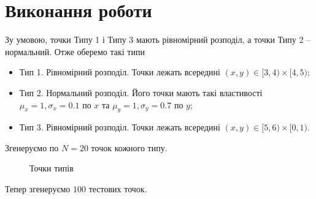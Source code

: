 \documentclass[a4paper,12pt]{article}
\begin{document}
\section{Виконання роботи}

Зу умовою, точки Типу 1 і Типу 3 мають рівномірний розподіл, а точки Типу 2 -- нормальний. Отже оберемо такі типи
\begin{itemize}
	\item Тип 1. Рівномірний розподіл. Точки лежать всередині $(x,y) \in [3,4) \times [4,5)$;
	\item Тип 2. Нормальний розподіл. Його точки мають такі властивості  $\mu_x = 1, \sigma_x = 0.1$ по $x$ та $\mu_y = 1, \sigma_y = 0.7$ по $y$;
	\item Тип 3. Рівномірний розподіл. Точки лежать всередині $(x,y) \in [5,6) \times [0,1)$.
\end{itemize}

Згенеруємо по $N=20$ точок кожного типу.

\begin{figure}[h!]
	\caption{Точки типів}
\end{figure}

Тепер згенеруємо $100$ тестових точок.
\end{document}

